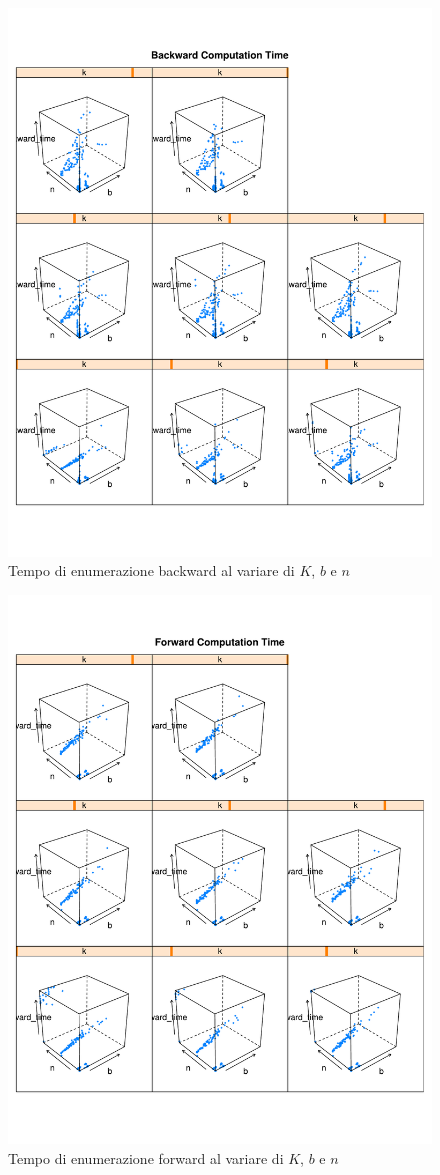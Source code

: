 \documentclass{llncs}
\begin{document}
\begin{figure}[!h]
  \centering
  \includegraphics[width=12cm]{img/graph_all-time_by_nbk_bw.pdf}
  \caption{Tempo di enumerazione backward al variare di $K$, $b$ e $n$}
  \label{fig:time_by_nbk_bw}
\end{figure}

\newpage

\begin{figure}[!h]
  \centering
  \includegraphics[width=12cm]{img/graph_all-time_by_nbk_fw.pdf}
  \caption{Tempo di enumerazione forward al variare di $K$, $b$ e $n$}
  \label{fig:time_by_nbk_fw}

\end{figure}

\newpage

 
\end{document}
